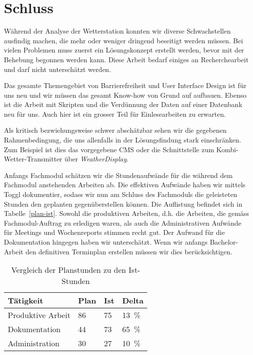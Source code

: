 \section{Schluss}
Während der Analyse der Wetterstation konnten wir diverse Schwachstellen ausfindig machen, die mehr oder weniger dringend beseitigt werden müssen.
Bei vielen Problemen muss zuerst ein Lösungskonzept erstellt werden, bevor mit der Behebung begonnen werden kann. Diese Arbeit bedarf einiges an Recherchearbeit und darf nicht unterschätzt werden.
\newline

\noindent
Das gesamte Themengebiet von Barrierefreiheit und User Interface Design ist für uns neu und wir müssen das gesamt Know-how von Grund auf aufbauen. Ebenso ist die Arbeit mit Skripten und die Verdünnung der Daten auf einer Datenbank neu für uns. Auch hier ist ein grosser Teil für Einlesearbeiten zu erwarten.
\newline

\noindent
Als kritisch bezwiehungsweise schwer abschätzbar sehen wir die gegebenen Rahmenbedingung, die uns allenfalls in der Lösungsfindung stark einschränken.
Zum Beispiel ist dies das vorgegebene CMS oder die Schnittstelle zum Kombi-Wetter-Transmitter über \textit{WeatherDisplay}.
\newline

\noindent
Anfangs Fachmodul schätzen wir die Stundenaufwände für die während dem Fachmodul anstehenden Arbeiten ab. Die effektiven Aufwände haben wir mittels Toggl dokumentier, sodass wir nun am Schluss des Fachmoduls die geleisteten Stunden den geplanten gegenüberstellen können. Die Auflistung befindet sich in Tabelle~\ref{plan-ist}. 
Sowohl die produktiven Arbeiten, d.h. die Arbeiten, die gemäss Fachmodul-Auftrag zu erledigen waren, als auch die Administrativen Aufwände für Meetings und Wochenreports stimmen recht gut. Der Aufwand für die Dokumentation hingegen haben wir unterschätzt. Wenn wir anfangs Bachelor-Arbeit den definitiven Terminplan erstellen müssen wir dies berücksichtigen.
\newline

\begin{table}[h]
\centering
\begin{tabular}{|l|l|l|l|}
\hline
 Tätigkeit			&  Plan	& Ist  	& Delta  		\\ \hline
 Produktive Arbeit	&  86		&  75		&  13~\%		\\ \hline
 Dokumentation		&  44		&  73		&  65~\%		\\ \hline
 Administration		&  30		&  27		&  10~\%		\\ \hline
\end{tabular}
\caption{Vergleich der Planstunden zu den Ist-Stunden}
\label{table:plan-ist}
\end{table}

